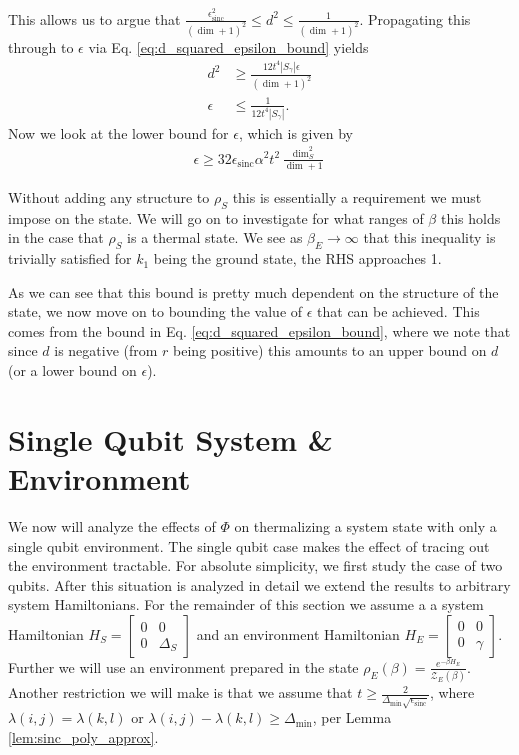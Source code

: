 \documentclass{article}
\newcommand{\partfun}{\mathcal{Z}}
\DeclareMathOperator{\sinc}{sinc}
\begin{document}
    This allows us to argue that $\frac{\epsilon_{\sinc}^2}{(\dim + 1)^2} \leq d^2 \leq \frac{1}{(\dim + 1)^2}$. Propagating this through to $\epsilon$ via Eq. \eqref{eq:d_squared_epsilon_bound} yields 
    \begin{align}
        d^2 &\geq \frac{12 t^4 |S_{\gamma}| \epsilon}{(\dim + 1)^2} \\
        \epsilon &\leq \frac{1}{12 t^4 |S_{\gamma}|}.
    \end{align}
    Now we look at the lower bound for $\epsilon$, which is given by 
    \begin{align}
        \epsilon \geq 32 \epsilon_{\sinc} \alpha^2 t^2 \frac{\dim_S^2}{\dim + 1}
    \end{align}
    
    
    Without adding any structure to $\rho_S$ this is essentially a requirement we must impose on the state. We will go on to investigate for what ranges of $\beta$ this holds in the case that $\rho_S$ is a thermal state. We see as $\beta_E \to \infty$ that this inequality is trivially satisfied for $k_1$ being the ground state, the RHS approaches 1.
    
    As we can see that this bound is pretty much dependent on the structure of the state, we now move on to bounding the value of $\epsilon$ that can be achieved. This comes from the bound in Eq. \eqref{eq:d_squared_epsilon_bound}, where we note that since $d$ is negative (from $r$ being positive) this amounts to an upper bound on $d$ (or a lower bound on $\epsilon$).
    



\section{Single Qubit System \& Environment}
We now will analyze the effects of $\Phi$ on thermalizing a system state with only a single qubit environment. The single qubit case makes the effect of tracing out the environment tractable. For absolute simplicity, we first study the case of two qubits. After this situation is analyzed in detail we extend the results to arbitrary system Hamiltonians. For the remainder of this section we assume a a system Hamiltonian $H_S = \begin{bmatrix}
    0 & 0 \\ 0 & \Delta_S
\end{bmatrix}$ and an environment Hamiltonian $H_E = \begin{bmatrix}
    0 & 0 \\ 0 & \gamma
\end{bmatrix}$. Further we will use an environment prepared in the state $\rho_E(\beta) = \frac{e^{-\beta H_E}}{\partfun_E(\beta)}$. Another restriction we will make is that we assume that $t \geq \frac{2}{\Delta_{\min} \sqrt{\epsilon_{\sinc}}}$, where $\lambda(i,j) = \lambda(k,l)$ or $\lambda(i,j) - \lambda(k,l) \geq \Delta_{\min}$, per Lemma \ref{lem:sinc_poly_approx}. 
\end{document}

